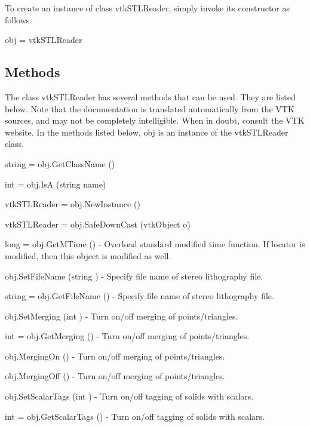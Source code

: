 To create an instance of class vtk\-S\-T\-L\-Reader, simply invoke its constructor as follows \begin{DoxyVerb}  obj = vtkSTLReader
\end{DoxyVerb}
 \hypertarget{vtkwidgets_vtkxyplotwidget_Methods}{}\subsection{Methods}\label{vtkwidgets_vtkxyplotwidget_Methods}
The class vtk\-S\-T\-L\-Reader has several methods that can be used. They are listed below. Note that the documentation is translated automatically from the V\-T\-K sources, and may not be completely intelligible. When in doubt, consult the V\-T\-K website. In the methods listed below, {\ttfamily obj} is an instance of the vtk\-S\-T\-L\-Reader class. 
\begin{DoxyItemize}
\item {\ttfamily string = obj.\-Get\-Class\-Name ()}  
\item {\ttfamily int = obj.\-Is\-A (string name)}  
\item {\ttfamily vtk\-S\-T\-L\-Reader = obj.\-New\-Instance ()}  
\item {\ttfamily vtk\-S\-T\-L\-Reader = obj.\-Safe\-Down\-Cast (vtk\-Object o)}  
\item {\ttfamily long = obj.\-Get\-M\-Time ()} -\/ Overload standard modified time function. If locator is modified, then this object is modified as well.  
\item {\ttfamily obj.\-Set\-File\-Name (string )} -\/ Specify file name of stereo lithography file.  
\item {\ttfamily string = obj.\-Get\-File\-Name ()} -\/ Specify file name of stereo lithography file.  
\item {\ttfamily obj.\-Set\-Merging (int )} -\/ Turn on/off merging of points/triangles.  
\item {\ttfamily int = obj.\-Get\-Merging ()} -\/ Turn on/off merging of points/triangles.  
\item {\ttfamily obj.\-Merging\-On ()} -\/ Turn on/off merging of points/triangles.  
\item {\ttfamily obj.\-Merging\-Off ()} -\/ Turn on/off merging of points/triangles.  
\item {\ttfamily obj.\-Set\-Scalar\-Tags (int )} -\/ Turn on/off tagging of solids with scalars.  
\item {\ttfamily int = obj.\-Get\-Scalar\-Tags ()} -\/ Turn on/off tagging of solids with scalars.  

\end{DoxyItemize}

